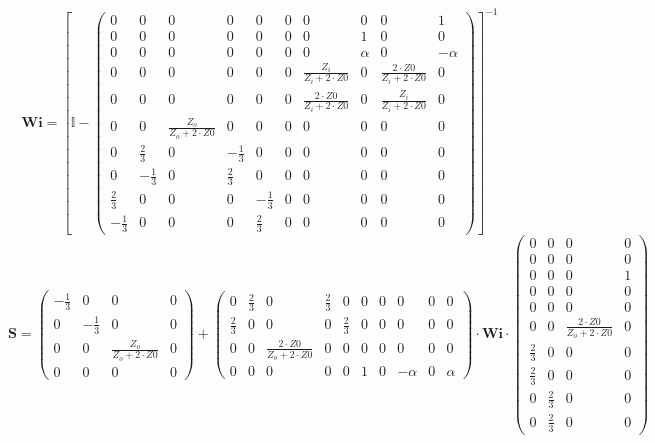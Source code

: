 \[ \mathbf{Wi} =  \left[ \mathbb{I}  - \left(\begin{smallmatrix} 0 & 0
& 0 & 0 & 0 & 0 & 0 & 0 & 0 & 1 \\ 0 & 0 & 0 & 0 & 0 & 0 & 0 & 1 & 0 &
0 \\ 0 & 0 & 0 & 0 & 0 & 0 & 0 & \alpha & 0 & -\alpha \\ 0 & 0 & 0 & 0
& 0 & 0 & \frac{Z_i}{Z_i+2\cdot Z0} & 0 & \frac{2\cdot Z0}{Z_i+2\cdot
Z0} & 0 \\ 0 & 0 & 0 & 0 & 0 & 0 & \frac{2\cdot Z0}{Z_i+2\cdot Z0} & 0
& \frac{Z_i}{Z_i+2\cdot Z0} & 0 \\ 0 & 0 & \frac{Z_o}{Z_o+2\cdot Z0} &
0 & 0 & 0 & 0 & 0 & 0 & 0 \\ 0 & \frac{2}{3} & 0 & -\frac{1}{3} & 0 &
0 & 0 & 0 & 0 & 0 \\ 0 & -\frac{1}{3} & 0 & \frac{2}{3} & 0 & 0 & 0 &
0 & 0 & 0 \\ \frac{2}{3} & 0 & 0 & 0 & -\frac{1}{3} & 0 & 0 & 0 & 0 &
0 \\ -\frac{1}{3} & 0 & 0 & 0 & \frac{2}{3} & 0 & 0 & 0 & 0 & 0
\end{smallmatrix}\right) \right]^{-1}  \]
\[ \mathbf{S} = \left(\begin{smallmatrix} -\frac{1}{3} & 0 & 0 & 0 \\
0 & -\frac{1}{3} & 0 & 0 \\ 0 & 0 & \frac{Z_o}{Z_o+2\cdot Z0} & 0 \\ 0
& 0 & 0 & 0 \end{smallmatrix}\right) + \left(\begin{smallmatrix} 0 &
\frac{2}{3} & 0 & \frac{2}{3} & 0 & 0 & 0 & 0 & 0 & 0 \\ \frac{2}{3} &
0 & 0 & 0 & \frac{2}{3} & 0 & 0 & 0 & 0 & 0 \\ 0 & 0 & \frac{2\cdot
Z0}{Z_o+2\cdot Z0} & 0 & 0 & 0 & 0 & 0 & 0 & 0 \\ 0 & 0 & 0 & 0 & 0 &
1 & 0 & -\alpha & 0 & \alpha \end{smallmatrix}\right) \cdot
\mathbf{Wi} \cdot\left(\begin{smallmatrix} 0 & 0 & 0 & 0 \\ 0 & 0 & 0
& 0 \\ 0 & 0 & 0 & 1 \\ 0 & 0 & 0 & 0 \\ 0 & 0 & 0 & 0 \\ 0 & 0 &
\frac{2\cdot Z0}{Z_o+2\cdot Z0} & 0 \\ \frac{2}{3} & 0 & 0 & 0 \\
\frac{2}{3} & 0 & 0 & 0 \\ 0 & \frac{2}{3} & 0 & 0 \\ 0 & \frac{2}{3}
& 0 & 0 \end{smallmatrix}\right) \]
